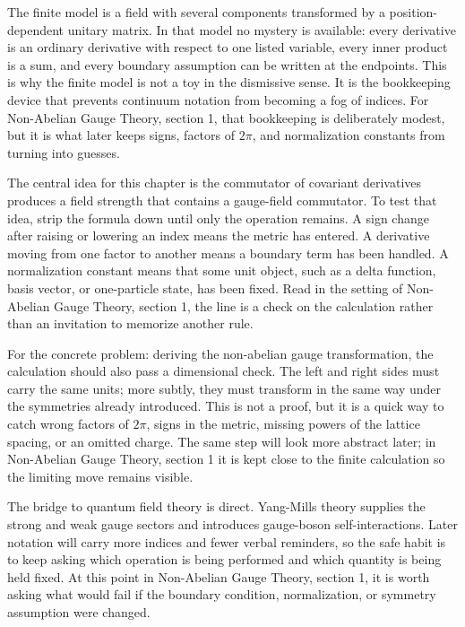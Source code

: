 The finite model is a field with several components transformed by a position-dependent unitary matrix.  In that model no mystery is available: every derivative is an ordinary derivative with respect to one listed variable, every inner product is a sum, and every boundary assumption can be written at the endpoints.  This is why the finite model is not a toy in the dismissive sense.  It is the bookkeeping device that prevents continuum notation from becoming a fog of indices.  For Non-Abelian Gauge Theory, section 1, that bookkeeping is deliberately modest, but it is what later keeps signs, factors of \(2\pi\), and normalization constants from turning into guesses.

The central idea for this chapter is the commutator of covariant derivatives produces a field strength that contains a gauge-field commutator.  To test that idea, strip the formula down until only the operation remains.  A sign change after raising or lowering an index means the metric has entered.  A derivative moving from one factor to another means a boundary term has been handled.  A normalization constant means that some unit object, such as a delta function, basis vector, or one-particle state, has been fixed.  Read in the setting of Non-Abelian Gauge Theory, section 1, the line is a check on the calculation rather than an invitation to memorize another rule.

For the concrete problem: deriving the non-abelian gauge transformation, the calculation should also pass a dimensional check.  The left and right sides must carry the same units; more subtly, they must transform in the same way under the symmetries already introduced.  This is not a proof, but it is a quick way to catch wrong factors of \(2\pi\), signs in the metric, missing powers of the lattice spacing, or an omitted charge.  The same step will look more abstract later; in Non-Abelian Gauge Theory, section 1 it is kept close to the finite calculation so the limiting move remains visible.

The bridge to quantum field theory is direct.  Yang-Mills theory supplies the strong and weak gauge sectors and introduces gauge-boson self-interactions.  Later notation will carry more indices and fewer verbal reminders, so the safe habit is to keep asking which operation is being performed and which quantity is being held fixed.  At this point in Non-Abelian Gauge Theory, section 1, it is worth asking what would fail if the boundary condition, normalization, or symmetry assumption were changed.

